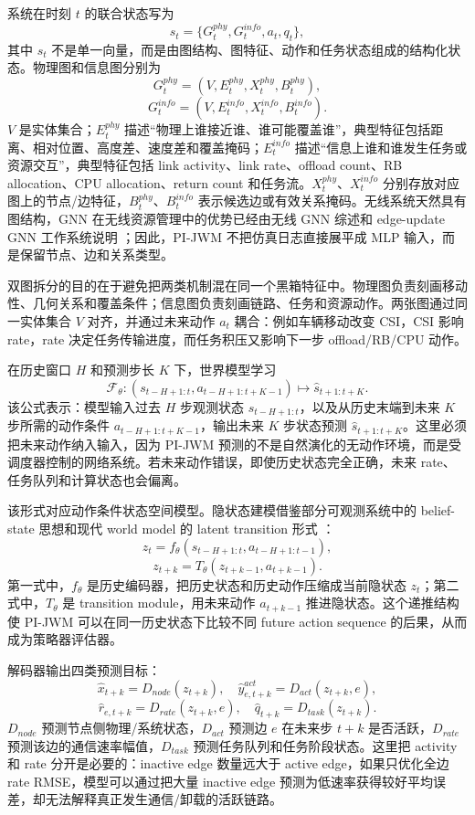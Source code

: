 \documentclass[letterpaper,journal]{IEEEtran}
\newcommand{\pjwm}{PI-JWM}
\begin{document}
系统在时刻 $t$ 的联合状态写为
\[
s_t=\{G_t^{phy},G_t^{info},a_t,q_t\},
\]
其中 $s_t$ 不是单一向量，而是由图结构、图特征、动作和任务状态组成的结构化状态。物理图和信息图分别为
\[
G_t^{phy}=(V,E_t^{phy},X_t^{phy},B_t^{phy}),
\]
\[
G_t^{info}=(V,E_t^{info},X_t^{info},B_t^{info}).
\]
$V$ 是实体集合；$E_t^{phy}$ 描述“物理上谁接近谁、谁可能覆盖谁”，典型特征包括距离、相对位置、高度差、速度差和覆盖掩码；$E_t^{info}$ 描述“信息上谁和谁发生任务或资源交互”，典型特征包括 link activity、link rate、offload count、RB allocation、CPU allocation、return count 和任务流。$X_t^{phy}$、$X_t^{info}$ 分别存放对应图上的节点/边特征，$B_t^{phy}$、$B_t^{info}$ 表示候选边或有效关系掩码。无线系统天然具有图结构，GNN 在无线资源管理中的优势已经由无线 GNN 综述和 edge-update GNN 工作系统说明 \cite{shen2023gnnwireless}\cite{engnn2024}；因此，\pjwm{} 不把仿真日志直接展平成 MLP 输入，而是保留节点、边和关系类型。

双图拆分的目的在于避免把两类机制混在同一个黑箱特征中。物理图负责刻画移动性、几何关系和覆盖条件；信息图负责刻画链路、任务和资源动作。两张图通过同一实体集合 $V$ 对齐，并通过未来动作 $a_t$ 耦合：例如车辆移动改变 CSI，CSI 影响 rate，rate 决定任务传输进度，而任务积压又影响下一步 offload/RB/CPU 动作。

在历史窗口 $H$ 和预测步长 $K$ 下，世界模型学习
\[
\mathcal{F}_\theta:\left(s_{t-H+1:t},a_{t-H+1:t+K-1}\right)\mapsto \hat{s}_{t+1:t+K}.
\]
该公式表示：模型输入过去 $H$ 步观测状态 $s_{t-H+1:t}$，以及从历史末端到未来 $K$ 步所需的动作条件 $a_{t-H+1:t+K-1}$，输出未来 $K$ 步状态预测 $\hat{s}_{t+1:t+K}$。这里必须把未来动作纳入输入，因为 PI-JWM 预测的不是自然演化的无动作环境，而是受调度器控制的网络系统。若未来动作错误，即使历史状态完全正确，未来 rate、任务队列和计算状态也会偏离。

该形式对应动作条件状态空间模型。隐状态建模借鉴部分可观测系统中的 belief-state 思想和现代 world model 的 latent transition 形式 \cite{kaelbling1998pomdp}\cite{ha2018worldmodels}\cite{hafner2019dreamer}：
\[
z_t=f_\theta(s_{t-H+1:t},a_{t-H+1:t-1}),
\]
\[
z_{t+k}=T_\theta(z_{t+k-1},a_{t+k-1}).
\]
第一式中，$f_\theta$ 是历史编码器，把历史状态和历史动作压缩成当前隐状态 $z_t$；第二式中，$T_\theta$ 是 transition module，用未来动作 $a_{t+k-1}$ 推进隐状态。这个递推结构使 PI-JWM 可以在同一历史状态下比较不同 future action sequence 的后果，从而成为策略器评估器。

解码器输出四类预测目标：
\[
\hat{x}_{t+k}=D_{node}(z_{t+k}),\quad
\hat{y}_{e,t+k}^{act}=D_{act}(z_{t+k},e),
\]
\[
\hat{r}_{e,t+k}=D_{rate}(z_{t+k},e),\quad
\hat{q}_{t+k}=D_{task}(z_{t+k}).
\]
$D_{node}$ 预测节点侧物理/系统状态，$D_{act}$ 预测边 $e$ 在未来步 $t+k$ 是否活跃，$D_{rate}$ 预测该边的通信速率幅值，$D_{task}$ 预测任务队列和任务阶段状态。这里把 activity 和 rate 分开是必要的：inactive edge 数量远大于 active edge，如果只优化全边 rate RMSE，模型可以通过把大量 inactive edge 预测为低速率获得较好平均误差，却无法解释真正发生通信/卸载的活跃链路。
\end{document}
